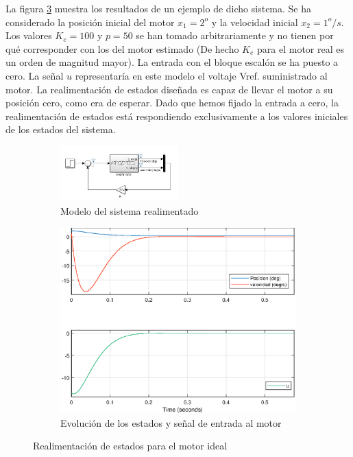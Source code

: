 \documentclass[10pt,a4paper]{report}
\begin{document}
La figura \ref{f31b} muestra los resultados de un ejemplo de dicho sistema. Se ha considerado la posición inicial del motor $x_1 = 2^o$ y la velocidad inicial $x_2= 1^o/s$.  Los valores $K_e = 100$ y $p = 50$ se han tomado arbitrariamente y  no tienen por qué corresponder con los del motor estimado (De hecho $K_e$ para el motor real es un orden de magnitud mayor). La entrada con el bloque escalón se ha puesto a cero. La señal $u$ representaría en este modelo el voltaje Vref. suministrado al motor. La realimentación de estados diseñada es capaz de llevar el motor a su posición cero, como era de esperar. Dado que hemos fijado la entrada a cero, la realimentación de estados está respondiendo exclusivamente a los valores iniciales de los estados del sistema.
\begin{figure}
\centering
\begin{subfigure}{\textwidth}
\centering
\includegraphics[width=0.5\textwidth]{r_estados.jpg}
\caption{Modelo del sistema realimentado}
\label{f31a}
\end{subfigure}
\begin{subfigure}{\textwidth}
\centering
\includegraphics[scale=0.6]{r_estados.eps}
\caption{Evolución de los estados y señal de entrada al motor}
\label{f31b}
\end{subfigure}
\caption{Realimentación de estados para el motor ideal}
\end{figure}
\end{document}

